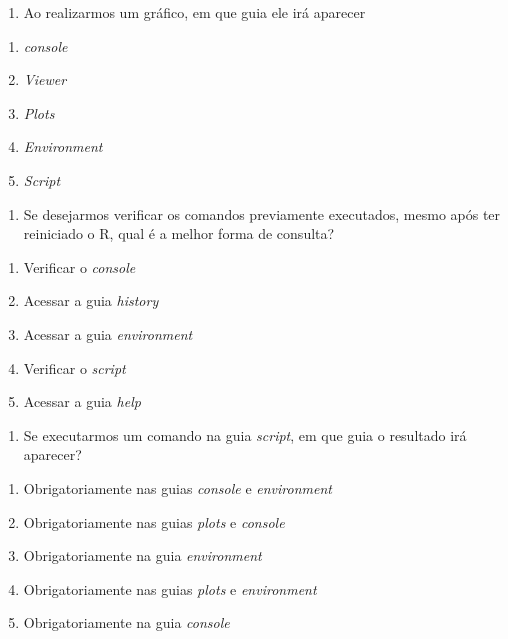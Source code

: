\documentclass[14pt,titlepage, oneside, openany, a4paper]{book}
\providecommand{\tightlist}{%
  \setlength{\itemsep}{0pt}\setlength{\parskip}{0pt}}
\begin{document}
\begin{enumerate}
\def\labelenumi{\arabic{enumi})}
\setcounter{enumi}{2}
\tightlist
\item
  Ao realizarmos um gráfico, em que guia ele irá aparecer
\end{enumerate}

\begin{enumerate}
\def\labelenumi{(\alph{enumi})}
\tightlist
\item
  \emph{console}
\item
  \emph{Viewer}
\item
  \emph{Plots}
\item
  \emph{Environment}
\item
  \emph{Script}
\end{enumerate}

\begin{enumerate}
\def\labelenumi{\arabic{enumi})}
\setcounter{enumi}{3}
\tightlist
\item
  Se desejarmos verificar os comandos previamente executados, mesmo após ter reiniciado o R, qual é a melhor forma de consulta?
\end{enumerate}

\begin{enumerate}
\def\labelenumi{(\alph{enumi})}
\tightlist
\item
  Verificar o \emph{console}
\item
  Acessar a guia \emph{history}
\item
  Acessar a guia \emph{environment}
\item
  Verificar o \emph{script}
\item
  Acessar a guia \emph{help}
\end{enumerate}

\begin{enumerate}
\def\labelenumi{\arabic{enumi})}
\setcounter{enumi}{4}
\tightlist
\item
  Se executarmos um comando na guia \emph{script}, em que guia o resultado irá aparecer?
\end{enumerate}

\begin{enumerate}
\def\labelenumi{(\alph{enumi})}
\tightlist
\item
  Obrigatoriamente nas guias \emph{console} e \emph{environment}
\item
  Obrigatoriamente nas guias \emph{plots} e \emph{console}
\item
  Obrigatoriamente na guia \emph{environment}
\item
  Obrigatoriamente nas guias \emph{plots} e \emph{environment}
\item
  Obrigatoriamente na guia \emph{console}
\end{enumerate}
\end{document}
